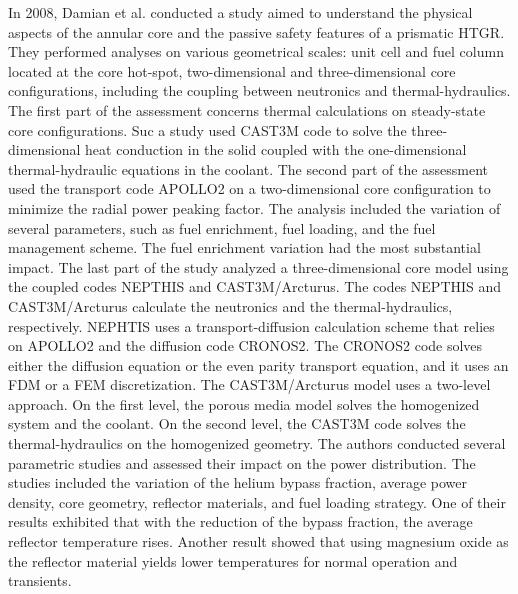 In 2008, Damian et al. \cite{damian_vhtr_2008} conducted a study aimed to understand the physical aspects of the annular core and the passive safety features of a prismatic \gls{HTGR}.
They performed analyses on various geometrical scales: unit cell and fuel column located at the core hot-spot, two-dimensional and three-dimensional core configurations, including the coupling between neutronics and thermal-hydraulics.
The first part of the assessment concerns thermal calculations on steady-state core configurations.
Suc a study used CAST3M \cite{studer_cast3marcturus_2007} code to solve the three-dimensional heat conduction in the solid coupled with the one-dimensional thermal-hydraulic equations in the coolant.
The second part of the assessment used the transport code APOLLO2 \cite{sanchez_apollo2_1999} on a two-dimensional core configuration to minimize the radial power peaking factor.
The analysis included the variation of several parameters, such as fuel enrichment, fuel loading, and the fuel management scheme.
The fuel enrichment variation had the most substantial impact.
The last part of the study analyzed a three-dimensional core model using the coupled codes NEPTHIS \cite{cavalier_presentation_2005} and CAST3M/Arcturus.
The codes NEPTHIS and CAST3M/Arcturus calculate the neutronics and the thermal-hydraulics, respectively.
NEPHTIS uses a transport-diffusion calculation scheme that relies on APOLLO2 and the diffusion code CRONOS2.
The CRONOS2 code solves either the diffusion equation or the even parity transport equation, and it uses an \gls{FDM} or a \gls{FEM} discretization.
The CAST3M/Arcturus model uses a two-level approach.
On the first level, the porous media model solves the homogenized system and the coolant.
On the second level, the CAST3M code solves the thermal-hydraulics on the homogenized geometry.
The authors conducted several parametric studies and assessed their impact on the power distribution.
The studies included the variation of the helium bypass fraction, average power density, core geometry, reflector materials, and fuel loading strategy.
One of their results exhibited that with the reduction of the bypass fraction, the average reflector temperature rises.
Another result showed that using magnesium oxide as the reflector material yields lower temperatures for normal operation and transients.

